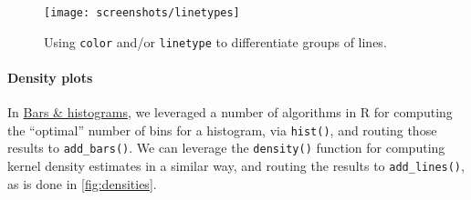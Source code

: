 \documentclass[12pt,]{isuthesis}
\newenvironment{Shaded}{\begin{snugshade}}{\end{snugshade}}
\newcommand{\KeywordTok}[1]{\textcolor[rgb]{0.13,0.29,0.53}{\textbf{{#1}}}}
\newcommand{\DataTypeTok}[1]{\textcolor[rgb]{0.13,0.29,0.53}{{#1}}}
\newcommand{\DecValTok}[1]{\textcolor[rgb]{0.00,0.00,0.81}{{#1}}}
\newcommand{\StringTok}[1]{\textcolor[rgb]{0.31,0.60,0.02}{{#1}}}
\newcommand{\OtherTok}[1]{\textcolor[rgb]{0.56,0.35,0.01}{{#1}}}
\newcommand{\NormalTok}[1]{{#1}}
\let\oldparagraph\paragraph
\renewcommand{\paragraph}[1]{\oldparagraph{#1}\mbox{}}
\begin{document}
\begin{Shaded}
\end{Shaded}

\begin{figure}
\centering
\texttt{[image: screenshots/linetypes]}
\caption{\label{fig:linetypes}Using \texttt{color} and/or \texttt{linetype}
to differentiate groups of lines.}
\end{figure}

\paragraph{Density plots}\label{density-plots-1}

In \protect\hyperlink{bars-histograms}{Bars \& histograms}, we leveraged
a number of algorithms in R for computing the ``optimal'' number of bins
for a histogram, via \texttt{hist()}, and routing those results to
\texttt{add\_bars()}. We can leverage the \texttt{density()} function
for computing kernel density estimates in a similar way, and routing the
results to \texttt{add\_lines()}, as is done in \ref{fig:densities}.
\end{document}
